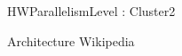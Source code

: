 \begin{Frame}{HWParallelismLevel : Cluster2}

  \begin{block}{Architecture Wikipedia}
  \end{block}

\end{Frame}

